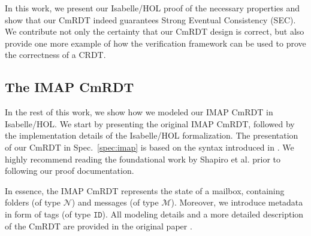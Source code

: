 \documentclass[11pt,a4paper, DIV=11]{article}
\begin{document}
In this work, we present our Isabelle/HOL proof of the necessary properties and
show that our CmRDT indeed guarantees Strong Eventual Consistency (SEC).
We contribute not only the certainty that our CmRDT design is correct,
but also provide one more example of how the verification framework
can be used to prove the correctness of a CRDT.


\subsection{The IMAP CmRDT}

In the rest of this work, we show how we modeled our IMAP CmRDT in Isabelle/HOL.
We start by presenting the original IMAP CmRDT, followed by the implementation
details of the Isabelle/HOL formalization. The presentation of our CmRDT in
Spec.~\ref{spec:imap} is based on the syntax introduced in \cite{shapiro_report}.
We highly recommend reading the foundational work by Shapiro et al{.} prior to
following our proof documentation.

In essence, the IMAP CmRDT represents the state of a mailbox, containing folders
(of type $\mathcal{N}$) and messages (of type $\mathcal{M}$). Moreover, we introduce
metadata in form of tags (of type $\texttt{ID}$). All modeling details and a more
detailed description of the CmRDT are provided in the original paper \cite{pluto}.
\end{document}
